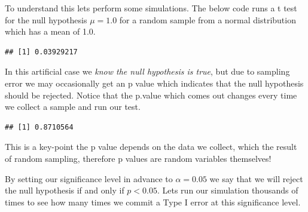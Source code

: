 \documentclass[
]{book}
\newenvironment{Shaded}{\begin{snugshade}}{\end{snugshade}}
\newcommand{\AttributeTok}[1]{\textcolor[rgb]{0.77,0.63,0.00}{#1}}
\newcommand{\DecValTok}[1]{\textcolor[rgb]{0.00,0.00,0.81}{#1}}
\newcommand{\FunctionTok}[1]{\textcolor[rgb]{0.00,0.00,0.00}{#1}}
\newcommand{\NormalTok}[1]{#1}
\newcommand{\SpecialCharTok}[1]{\textcolor[rgb]{0.00,0.00,0.00}{#1}}
\newcommand{\StringTok}[1]{\textcolor[rgb]{0.31,0.60,0.02}{#1}}
\theoremstyle{definition}
\theoremstyle{definition}
\theoremstyle{definition}
\theoremstyle{definition}
\theoremstyle{remark}
\begin{document}
To understand this lets perform some simulations. The below code runs a t test for the null hypothesis \(\mu=1.0\) for a random sample from a normal distribution which has a mean of 1.0.

\begin{Shaded}
\end{Shaded}

\begin{verbatim}
## [1] 0.03929217
\end{verbatim}

In this artificial case we \emph{know the null hypothesis is true}, but due to sampling error we may occasionally get an p value which indicates that the null hypothesis should be rejected. Notice that the p.value which comes out changes every time we collect a sample and run our test.

\begin{Shaded}
\end{Shaded}

\begin{verbatim}
## [1] 0.8710564
\end{verbatim}

This is a key-point the p value depends on the data we collect, which the result of random sampling, therefore p values are random variables themselves!

By setting our significance level in advance to \(\alpha=0.05\) we say that we will reject the null hypothesis if and only if \(p < 0.05\). Lets run our simulation thousands of times to see how many times we commit a Type I error at this significance level.
\end{document}
